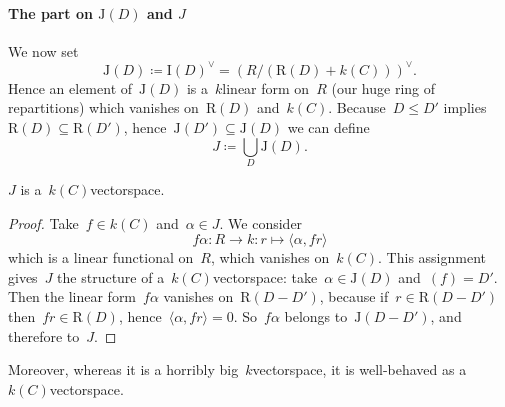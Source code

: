 \documentclass[10pt,a4paper]{article}
\begin{document}
\paragraph{The part on $\mathrm{J}(D)$ and $J$}
We now set
\begin{equation}
  \mathrm{J}(D)\coloneqq\mathrm{I}(D)^\vee=(R/(\mathrm{R}(D)+k(C)))^\vee.
\end{equation}
Hence an element of~$\mathrm{J}(D)$ is a~$k$\dash linear form on~$R$ (our huge ring of repartitions) which vanishes on~$\mathrm{R}(D)$ and~$k(C)$. Because~$D\leq D'$ implies~$\mathrm{R}(D)\subseteq\mathrm{R}(D')$, hence~$\mathrm{J}(D')\subseteq\mathrm{J}(D)$ we can define
\begin{equation}
  J\coloneqq\bigcup_{D}\mathrm{J}(D).
\end{equation}
\begin{lemma}
  \label{lemma:J-k(C)-vectorspace}
  $J$ is a~$k(C)$\dash vectorspace.
  \begin{proof}
    Take~$f\in k(C)$ and~$\alpha\in J$. We consider
    \begin{equation}
      f\alpha\colon R\to k:r\mapsto\langle\alpha,fr\rangle
    \end{equation}
    which is a linear functional on~$R$, which vanishes on~$k(C)$. This assignment gives~$J$ the structure of a~$k(C)$\dash vectorspace: take~$\alpha\in\mathrm{J}(D)$ and~$(f)=D'$. Then the linear form~$f\alpha$ vanishes on~$\mathrm{R}(D-D')$, because if~$r\in\mathrm{R}(D-D')$ then~$fr\in\mathrm{R}(D)$, hence~$\langle\alpha,fr\rangle=0$. So~$f\alpha$ belongs to~$\mathrm{J}(D-D')$, and therefore to~$J$.
  \end{proof}
\end{lemma}
Moreover, whereas it is a horribly big~$k$\dash vectorspace, it is well-behaved as a~$k(C)$\dash vectorspace.
\end{document}
